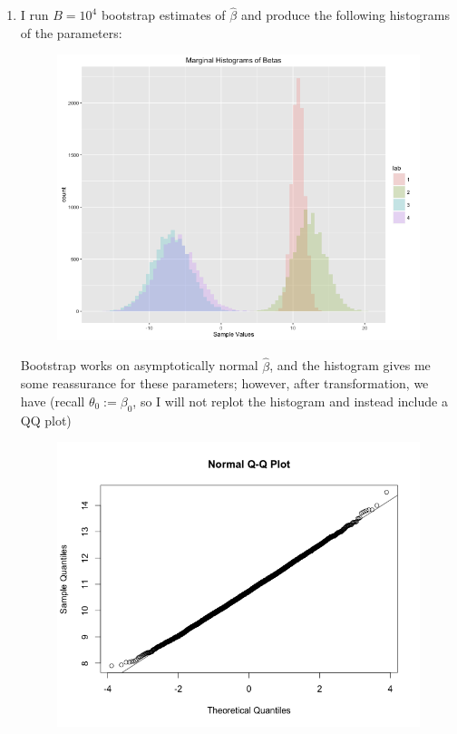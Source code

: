 \documentclass[11pt]{article}
\begin{document}
\begin{enumerate}
\begin{enumerate}
			\item I run $B=10^4$ bootstrap estimates of $\widehat{\beta}$ and produce the following histograms of the parameters:
			\begin{figure}[H]
				\centering
				\includegraphics[scale=0.5]{Rplot01}
			\end{figure}
			Bootstrap works on asymptotically normal $\widehat{\beta}$, and the histogram gives me some reassurance for these parameters; however, after transformation, we have (recall $\theta_0 := \beta_0$, so I will not replot the histogram and instead include a QQ plot)
			\begin{figure}[H]
				\includegraphics[scale=0.4]{Rplotafter}

\end{figure}
\end{enumerate}
\end{enumerate}
\end{document}
